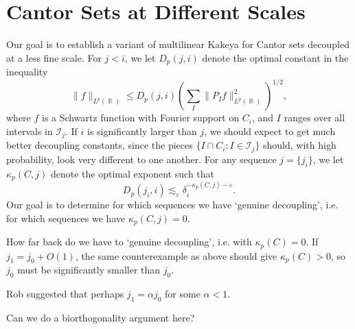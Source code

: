 \documentclass[dvipsnames,letterpaper,12pt]{article}
\numberwithin{equation}{section}
\DeclareMathOperator{\RR}{\mathbb{R}}
\numberwithin{theorem}{section}
\begin{document}
\section{Cantor Sets at Different Scales}

Our goal is to establish a variant of multilinear Kakeya for Cantor sets decoupled at a less fine scale. For $j < i$, we let $D_p(j,i)$ denote the optimal constant in the inequality
%
\[ \| f \|_{L^p(\RR)} \leq D_p(j,i) \left( \sum_I \| P_I f \|_{L^p(\RR)}^2 \right)^{1/2}, \]
%
where $f$ is a Schwartz function with Fourier support on $C_i$, and $I$ ranges over all intervals in $\mathcal{I}_j$. If $i$ is significantly larger than $j$, we should expect to get much better decoupling constants, since the pieces $\{ I \cap C_i : I \in \mathcal{I}_j \}$ should, with high probability, look very different to one another. For any sequence $j = \{ j_i \}$, we let $\kappa_p(C,j)$ denote the optimal exponent such that
%
\[ D_p(j_i,i) \lesssim_\varepsilon \delta_i^{-\kappa_p(C,j)-\varepsilon}. \]
%
Our goal is to determine for which sequences we have `genuine decoupling', i.e. for which sequences we have $\kappa_p(C,j) = 0$.

How far back do we have to `genuine decoupling', i.e. with $\kappa_p(C) = 0$. If $j_1 = j_0 + O(1)$, the same counterexample as above should give $\kappa_p(C) > 0$, so $j_0$ must be significantly smaller than $j_0$.


Rob suggested that perhaps $j_1 = \alpha j_0$ for some $\alpha < 1$.

Can we do a biorthogonality argument here?










\begin{comment}

In Zane's Paper, set with dimension s = log k / log q.

We get good decoupling for p <= 2/s, so it that scenario we get decoupling for p <= 2 log q /log k.
Here q is the base, and k is the maximum number of digits in the equation.


\end{comment}
\end{document}
